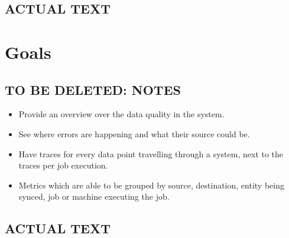 \subsection{ACTUAL TEXT}

\section{Goals}

\subsection{TO BE DELETED: NOTES}

\begin{itemize}
	\item Provide an overview over the data quality in the system.
	\item See where errors are happening and what their source could be.
	\item Have traces for every data point travelling through a system, next to the traces per job execution.
	\item Metrics which are able to be grouped by source, destination, entity being synced, job or machine executing the job.
\end{itemize}

\subsection{ACTUAL TEXT}
